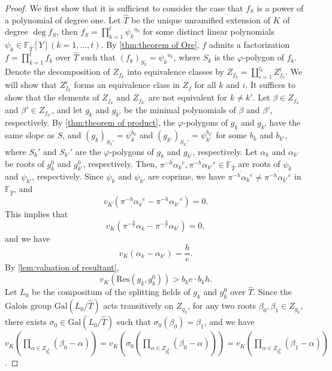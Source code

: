 \documentclass{article}
\newcommand{\field}[1]{\mathbb{#1}}
\newcommand{\Gal}{\mathrm{Gal}}
\theoremstyle{definition}
\theoremstyle{remark}
\numberwithin{equation}{section}
\begin{document}
  \begin{proof}
    We first show that it is sufficient to consider the case that $f_S$ is a power of a polynomial of degree one. 
    Let $\hat{T}$ be the unique unramified extension of $K$ of degree $\deg f_S$, then 
    $f_S = \prod_{k = 1}^t {\psi_k}^{a_k}$ for some distinct linear polynomials $\psi_k \in \field{F}_{\hat{T}}[Y] (k = 1, \dots ,t)$. 
    By \cref{thm:theorem of Ore}, $f$ admits a factorization $f = \prod_{k = 1}^t f_k$ over $\hat{T}$ such that $(f_k)_{S_{k}} = {\psi_k}^{a_k}$, where $S_{k}$ is the $\varphi$-polygon of $f_k$. 
    Denote the decomposition of $Z_{f_k}$ into equivalence classes by $Z_{f_k} = \coprod_{i = 1}^{l_k} Z_{f_k}^i$. 
    We will show that $Z_{f_k}^i$ forms an equivalence class in $Z_f$ for all $k$ and $i$. 
    It suffices to show that the elements of $Z_{f_k}$ and $Z_{f_{k'}}$ are not equivalent for $k \ne k'$. 
    Let $\beta \in Z_{f_k}$ and $\beta' \in Z_{f_{k'}}$, and  
    let $g_k$ and $g_{k'}$ be the minimal polynomials of $\beta$ and $\beta'$, respectively. 
    By \cref{thm:theorem of product}, the $\varphi$-polygons of $g_k$ and $g_{k'}$ have the same slope as $S$, 
    and $(g_k)_{S_{k}'} = \psi_k^{b_k}$ and $(g_{k'})_{S_{k'}'} = \psi_{k'}^{b_{k'}}$ for some $b_k$ and $b_{k'}$, where $S_{k}'$ and $S_{k'}'$ are the $\varphi$-polygons of $g_k$ and $g_{k'}$, respectively. 
    Let $\alpha_k$ and $\alpha_{k'}$ be roots of $g_k^0$ and $g_{k'}^0$, respectively. 
    Then, $\overline{\pi^{-h}{\alpha_k}^e}, \overline{\pi^{-h}{\alpha_{k'}}^e} \in \field{F}_{\hat{T}}$ are roots of $\psi_k$ and $\psi_{k'}$, respectively. 
    Since $\psi_k$ and $\psi_{k'}$ are coprime, we have $\overline{\pi^{-h}{\alpha_k}^e} \ne \overline{\pi^{-h}{\alpha_{k'}}^e}$ in $\field{F}_{\hat{T}}$, and 
    \[
      v_K(\pi^{-h}{\alpha_k}^e - \pi^{-h}{\alpha_{k'}}^e) = 0. 
    \]
    This implies that 
    \[
      v_K(\pi^{-\frac{h}{e}}\alpha_k - \pi^{-\frac{h}{e}}\alpha_{k'}) = 0, 
    \]
    and we have 
    \[
      v_K(\alpha_k - \alpha_{k'}) = \frac{h}{e}. 
    \]
    By \cref{lem:valuation of resultant}, 
    \[
      v_K(\mathrm{Res}(g_k,g_k^0)) > b_k e \cdot b_k h. 
    \]
    Let $L_0$ be the compositum of the splitting fields of $g_k$ and $g_k^0$ over $\hat{T}$. 
    Since the Galois group $\Gal(L_0/\hat{T})$ acts transitively on $Z_{g_k}$,
    for any two roots $\beta_0, \beta_1 \in Z_{g_k}$, there exists $\sigma_0 \in \Gal(L_0/\hat{T})$ such that 
    $\sigma_0(\beta_0) = \beta_1$, and we have $v_K(\prod_{\alpha \in Z_{g_k^0}} (\beta_0 - \alpha)) = v_K(\sigma_0(\prod_{\alpha \in Z_{g_k^0}} (\beta_0 - \alpha))) = v_K(\prod_{\alpha \in Z_{g_k^0}} (\beta_1 - \alpha))$. 

\end{proof}
\end{document}

